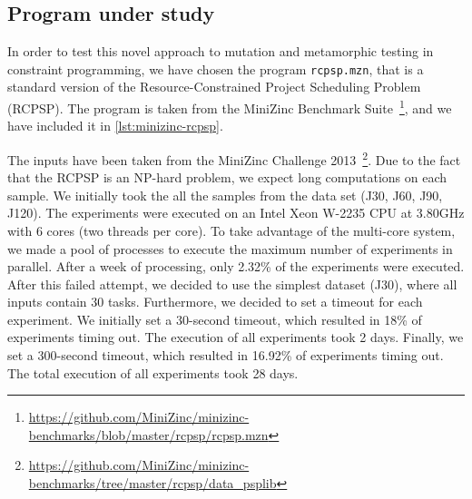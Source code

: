 \subsection{Program under study}
In order to test this novel approach to mutation and metamorphic
testing in constraint programming, we have chosen the program
\lstinline|rcpsp.mzn|, that is a standard version of
the Resource-Constrained Project Scheduling Problem (RCPSP). The
program is taken from the MiniZinc Benchmark
Suite~\footnote{\url{https://github.com/MiniZinc/minizinc-benchmarks/blob/master/rcpsp/rcpsp.mzn}},
and we have included it in \ref{lst:minizinc-rcpsp}.

The inputs have been taken from the MiniZinc Challenge
2013~\footnote{\url{https://github.com/MiniZinc/minizinc-benchmarks/tree/master/rcpsp/data_psplib}}. 
Due to the fact that the RCPSP is an NP-hard problem, we expect long computations on each sample. We initially took the all the samples from the
data set (J30, J60, J90, J120). 
The experiments were executed on an Intel Xeon W-2235 CPU at 3.80GHz with 6 cores (two threads per core). To take advantage of the multi-core system, we made a pool of processes to execute the maximum number of experiments in parallel. After a week of processing, only 2.32\% of the experiments were executed.
After this failed attempt, we decided to use the simplest
dataset (J30), where all inputs contain 30 tasks. Furthermore, we decided to set a timeout for each experiment. We initially set a 30-second timeout, which resulted in 18\% of experiments timing out. The execution of all experiments took 2 days. Finally, we set a 300-second timeout, which resulted in 16.92\% of experiments timing out. The total execution of all experiments took 28 days. 

